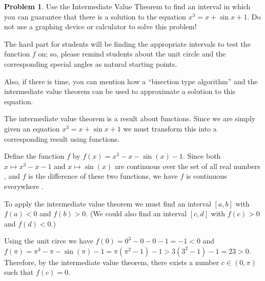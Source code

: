 \documentclass{article}
\theoremstyle{definition}
\newtheorem{Problem}{Problem}
\begin{document}
\begin{Problem}
  Use the Intermediate Value Theorem to find an interval in which you can guarantee that there is a solution to the equation $x^3 = x + \sin x + 1$.
  Do not use a graphing device or calculator to solve this problem!
\end{Problem}
\begin{Instructor Notes}
  The hard part for students will be finding the appropriate intervals to test the function $f$ on; so, please remind students about the unit circle and the corresponding special angles as natural starting points.

  Also, if there is time, you can mention how a ``bisection type algorithm'' and the intermediate value theorem can be used to approximate a solution to this equation.
\end{Instructor Notes}
\begin{Solution}
  The intermediate value theorem is a result about functions.
  Since we are simply given an equation $x^3 = x + \sin x + 1$ we must transform this into a corresponding result using functions.

  Define the function $f$ by $f(x) = x^3 - x - \sin(x) - 1$.
  Since both $x \mapsto x^3 - x - 1$ and $x \mapsto \sin(x)$ are continuous over the set of all real numbers \cite[Theorems 2.10 and 2.15]{briggs_calculus_2015}, and $f$ is the difference of these two functions, we have $f$ is continuous everywhere \cite[Theorem 2.9]{briggs_calculus_2015}.

  To apply the intermediate value theorem we must find an interval $[a, b]$ with $f(a) < 0$ and $f(b) > 0$.
  (We could also find an interval $[c, d]$ with $f(c) > 0$ and $f(d) < 0$.)

  Using the unit circe we have $f(0) = 0^3 - 0 - 0 - 1 = -1 < 0$ and $f(\pi) = \pi^3 - \pi - \sin(\pi) - 1 = \pi(\pi^2 - 1) - 1 > 3(3^2 - 1) - 1 = 23 > 0$.
  Therefore, by the intermediate value theorem, there exists a number $c \in (0, \pi)$ such that $f(c) = 0$.


  \end{Solution}
\printbibliography
\end{document}

